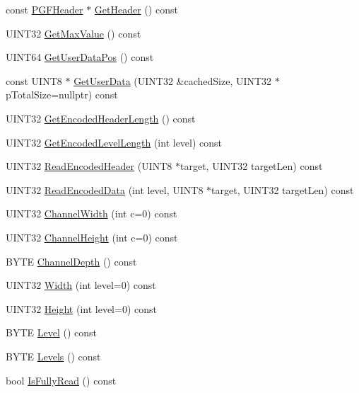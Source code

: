 \begin{DoxyCompactItemize}
const \mbox{\hyperlink{structPGFHeader}{P\+G\+F\+Header}} $\ast$ \mbox{\hyperlink{classCPGFImage_a485b62ca1f9b649d6ff590fe28657cf3}{Get\+Header}} () const
\item 
U\+I\+N\+T32 \mbox{\hyperlink{classCPGFImage_a205a92be52bd2047ade0398ed4bb2afb}{Get\+Max\+Value}} () const
\item 
U\+I\+N\+T64 \mbox{\hyperlink{classCPGFImage_a216a89fa33c755a379ba243610284b03}{Get\+User\+Data\+Pos}} () const
\item 
const U\+I\+N\+T8 $\ast$ \mbox{\hyperlink{classCPGFImage_aa7c092c2b27df184d7e81bef579e270c}{Get\+User\+Data}} (U\+I\+N\+T32 \&cached\+Size, U\+I\+N\+T32 $\ast$p\+Total\+Size=nullptr) const
\item 
U\+I\+N\+T32 \mbox{\hyperlink{classCPGFImage_acf90fa7c083fba0479ce70200cccf716}{Get\+Encoded\+Header\+Length}} () const
\item 
U\+I\+N\+T32 \mbox{\hyperlink{classCPGFImage_a9d39b7f0067bf5b35b0cd7cbba9a1d4f}{Get\+Encoded\+Level\+Length}} (int level) const
\item 
U\+I\+N\+T32 \mbox{\hyperlink{classCPGFImage_a55a27e09a6bcd1bca6d57335956dc76c}{Read\+Encoded\+Header}} (U\+I\+N\+T8 $\ast$target, U\+I\+N\+T32 target\+Len) const
\item 
U\+I\+N\+T32 \mbox{\hyperlink{classCPGFImage_a570d1d1072cdd3e24b838c066abc8da3}{Read\+Encoded\+Data}} (int level, U\+I\+N\+T8 $\ast$target, U\+I\+N\+T32 target\+Len) const
\item 
U\+I\+N\+T32 \mbox{\hyperlink{classCPGFImage_a3db1d8a7c652f726b7f15fa3fdc7e958}{Channel\+Width}} (int c=0) const
\item 
U\+I\+N\+T32 \mbox{\hyperlink{classCPGFImage_a0e8b083f86199861e78334054c945863}{Channel\+Height}} (int c=0) const
\item 
B\+Y\+TE \mbox{\hyperlink{classCPGFImage_a5f94308750aece503dc6433d1ad89c8a}{Channel\+Depth}} () const
\item 
U\+I\+N\+T32 \mbox{\hyperlink{classCPGFImage_a327590f3bda3700649fbc7c99f8206f2}{Width}} (int level=0) const
\item 
U\+I\+N\+T32 \mbox{\hyperlink{classCPGFImage_aab401a02923fc9161e890602f26c829e}{Height}} (int level=0) const
\item 
B\+Y\+TE \mbox{\hyperlink{classCPGFImage_a4619eb255afd03dabea2b0afbe6e0d94}{Level}} () const
\item 
B\+Y\+TE \mbox{\hyperlink{classCPGFImage_ab3678d05c031dc4cbf5451e7f4f6bdf3}{Levels}} () const
\item 
bool \mbox{\hyperlink{classCPGFImage_a3b6f8f9c75dd377a3cd6bf1e07e68531}{Is\+Fully\+Read}} () const

\end{DoxyCompactItemize}
